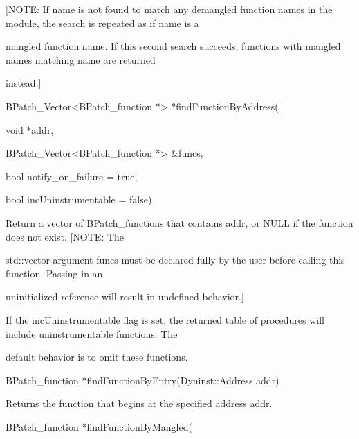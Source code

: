 {

[NOTE: If name is not found to match any demangled function names in the module, the search is repeated as if name is a

mangled function name. If this second search succeeds, functions with mangled names matching name are returned

instead.]}



{

BPatch_Vector<BPatch_function *> *findFunctionByAddress(}



{

void *addr,}



{

BPatch_Vector<BPatch_function *> &funcs,}



{

bool notify_on_failure = true,}



{

bool incUninstrumentable = false)}



{

Return a vector of BPatch_functions that contains addr, or NULL if the function does not exist. [NOTE: The

std::vector argument funcs must be declared fully by the user before calling this function. Passing in an

uninitialized reference will result in undefined behavior.]}



{

If the incUninstrumentable flag is set, the returned table of procedures will include uninstrumentable functions. The

default behavior is to omit these functions.}



{

BPatch_function *findFunctionByEntry(Dyninst::Address addr)}



{

Returns the function that begins at the specified address addr.}



{

BPatch_function *findFunctionByMangled(}



